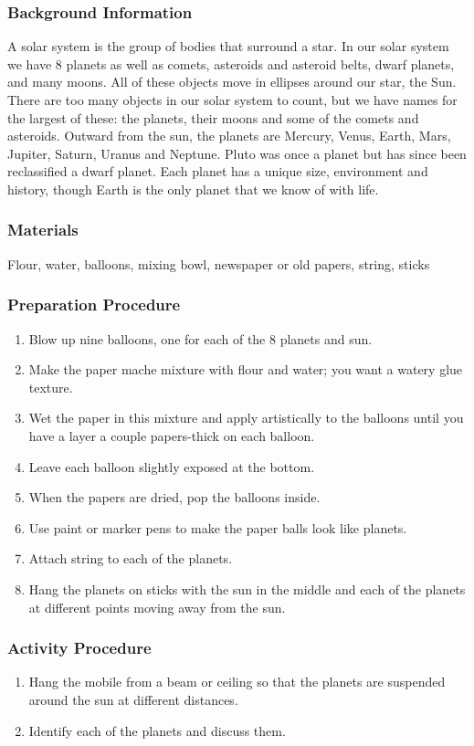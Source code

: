 \subsubsection*{Background Information}
A solar system is the group of bodies that surround a star. In our solar system we have 8 planets as well as comets, asteroids and asteroid belts, dwarf planets, and many moons. All of these objects move in ellipses around our star, the Sun. There are too many objects in our solar system to count, but we have names for the largest of these: the planets, their moons and some of the comets and asteroids. Outward from the sun, the planets are Mercury, Venus, Earth, Mars, Jupiter, Saturn, Uranus and Neptune. Pluto was once a planet but has since been reclassified a dwarf planet. Each planet has a unique size, environment and history, though Earth is the only planet that we know of with life.

\subsubsection*{Materials} Flour, water, balloons, mixing bowl, newspaper or old papers, string, sticks

\subsubsection*{Preparation Procedure}
\begin{enumerate}
\item{Blow up nine balloons, one for each of the 8 planets and sun.}
\item{Make the paper mache mixture with flour and water; you want a watery glue texture.}
\item{Wet the paper in this mixture and apply artistically to the balloons until you have a layer a couple papers-thick on each balloon.}
\item{Leave each balloon slightly exposed at the bottom.}
\item{When the papers are dried, pop the balloons inside.}
\item{Use paint or marker pens to make the paper balls look like planets.}
\item{Attach string to each of the planets.}
\item{Hang the planets on sticks with the sun in the middle and each of the planets at different points moving away from the sun.}
\end{enumerate}

\subsubsection*{Activity Procedure}
\begin{enumerate}
\item{Hang the mobile from a beam or ceiling so that the planets are suspended around the sun at different distances.}
\item{Identify each of the planets and discuss them.}
\end{enumerate}

